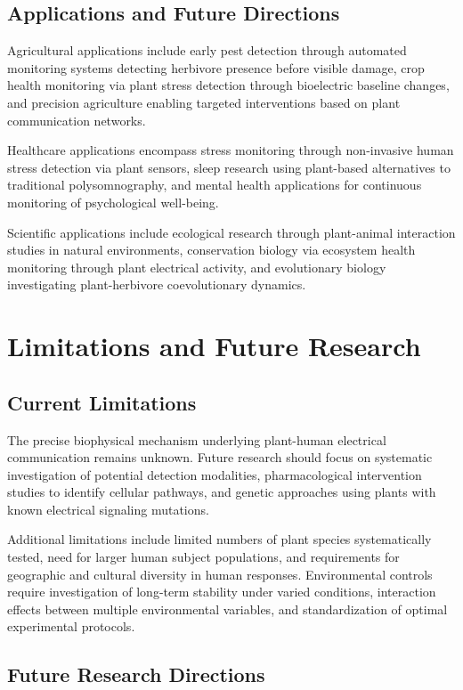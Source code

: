 \documentclass{article}
\begin{document}
\subsection{Applications and Future Directions}

Agricultural applications include early pest detection through automated monitoring systems detecting herbivore presence before visible damage, crop health monitoring via plant stress detection through bioelectric baseline changes, and precision agriculture enabling targeted interventions based on plant communication networks.

Healthcare applications encompass stress monitoring through non-invasive human stress detection via plant sensors, sleep research using plant-based alternatives to traditional polysomnography, and mental health applications for continuous monitoring of psychological well-being.

Scientific applications include ecological research through plant-animal interaction studies in natural environments, conservation biology via ecosystem health monitoring through plant electrical activity, and evolutionary biology investigating plant-herbivore coevolutionary dynamics.

\section{Limitations and Future Research}

\subsection{Current Limitations}

The precise biophysical mechanism underlying plant-human electrical communication remains unknown. Future research should focus on systematic investigation of potential detection modalities, pharmacological intervention studies to identify cellular pathways, and genetic approaches using plants with known electrical signaling mutations.

Additional limitations include limited numbers of plant species systematically tested, need for larger human subject populations, and requirements for geographic and cultural diversity in human responses. Environmental controls require investigation of long-term stability under varied conditions, interaction effects between multiple environmental variables, and standardization of optimal experimental protocols.

\subsection{Future Research Directions}
\end{document}
